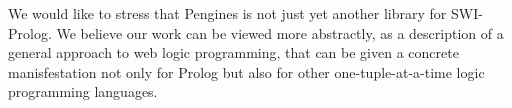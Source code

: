 \documentclass{new_tlp}
\begin{document}
We would like to stress that Pengines is not just yet another library
for SWI-Prolog. We believe our work can be viewed more abstractly, as a
description of a general approach to web logic programming, that can be
given a concrete manisfestation not only for Prolog but also for other
one-tuple-at-a-time logic programming languages.





\label{lastpage}
\end{document}
